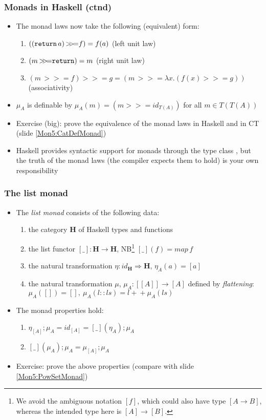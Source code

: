 \documentclass[handout]{beamer}
\newcommand{\To}{\Rightarrow}
\newcommand{\bfsf}[1]{{\boldsymbol{#1}}}
\newcommand{\HH}{\bfsf{H}}
\newcommand{\bind}{{>}\!\!{>}\!{=}}
\newcommand{\ttt}[1]{\text{\tt #1}}
\begin{document}
\frame
  {   
    \frametitle{Monads in Haskell (ctnd)}\label{Mon5:MonadHaskCtnd}

 \begin{itemize}[<+->]
\item The monad laws now take the following (equivalent) form:
\begin{enumerate}
    \item $((\ttt{return}\,a)\, \bind f) = f(a)$ (left unit law)
    \item $(m\, \bind \ttt{return}) = m$ (right unit law)
    \item $(m\, \bind f) \bind g = (m\, \bind \lambda x. (f(x) \bind g))$ (associativity)
 \end{enumerate}
\item $\mu_A$ is definable by $\mu_A(m) = (m\bind id_{T(A)})$ for all $m\in T(T(A))$
\item Exercise (big): prove the equivalence of the monad laws in Haskell 
and in CT (slide \ref{Mon5:CatDefMonad})
\item Haskell provides syntactic support for monads through the type class
\ttt{Monad}, but the truth of the monad laws (the compiler expects them to hold)
is your own responsibility
 \end{itemize}

 }


\frame
  {   
    \frametitle{The list monad}\label{Mon5:ListMonad}

 \begin{itemize}[<+->]
\item The \emph{list monad} consists of the following data:
 \begin{enumerate}
    \item the category $\HH$ of Haskell types and functions
    \item the list functor $[\_]:\HH\to\HH$, NB\footnote%
{We avoid the ambiguous notation $[f]$, which could also have type $[A\to B]$,
whereas the intended type here is $[A]\to [B]$.}
 $[\_](f)  =  map\, f$
    \item the natural transformation $\eta: id_\HH \To \HH$, $\eta_A(a)= [a]$
    \item the natural transformation $\mu$, 
$\mu_A: [[A]] \to [A] $ defined by \emph{flattening}:
$\mu_A([]) = [],~\mu_A(l::ls) = l{+}\!{+}\mu_A(ls)$
 \end{enumerate}
\item The monad properties hold:
 \begin{enumerate}
    \item $\eta_{[A]};\mu_A = id_{[A]} = [\_](\eta_A);\mu_A$
    \item $[\_](\mu_A);\mu_A = \mu_{[A]};\mu_A$
 \end{enumerate}
\item Exercise: prove the above properties (compare with slide \ref{Mon5:PowSetMonad})
 \end{itemize}

 }
\end{document}

